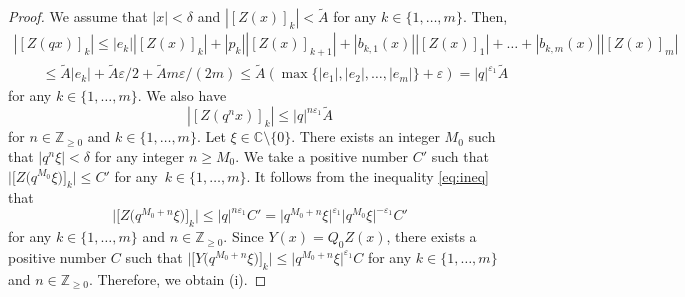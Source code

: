 \documentclass[pdftex]{sigma}
\numberwithin{equation}{section}
\theoremstyle{definition}
\begin{document}
\begin{proof}
We assume that $|x| < \delta $ and $|[Z(x )]_k| < \widetilde{A}$ for any $k \in \{1, \dots ,m \}$.
Then,
\begin{gather}
 | [Z(qx )]_k | \leq |e_k| | [Z(x )]_k| + |p_k | | [Z(x )]_{k+1}| + |b_{k,1}(x)| | [Z(x )]_1| + \dots + |b_{k,m}(x) | |[Z(x )]_m | \nonumber \\
\qquad \leq \widetilde{A} |e_k| + \widetilde{A} \varepsilon /2 + \widetilde{A} m \varepsilon /(2m) \leq \widetilde{A} ( \max \{ |e_1|, |e_2|, \dots , |e_m| \} + \varepsilon ) = |q|^{\varepsilon _1} \widetilde{A} \label{eq:Zqxineq}
\end{gather}
for any $k \in \{1, \dots ,m \}$.
We also have
\begin{equation}
 | [Z(q^n x )]_k | \leq |q|^{n \varepsilon _1} \widetilde{A} \label{eq:ineq}
\end{equation}
for $n \in \mathbb{Z} _{\geq 0} $ and $k \in \{1, \dots ,m \}$.
Let $\xi \in \mathbb{C} \setminus \{0\} $.
There exists an integer $M_0$ such that $| q^n \xi | < \delta $ for any integer $n \geq M_0$.
We take a positive number $C' $ such that $\big| \big[Z\bigl( q^{M_0} \xi \bigr)\big]_k\big| \leq C' $ for any~${k \in \{1, \dots ,m \}}$.
It follows from the inequality \eqref{eq:ineq} that
\[
\big| \big[Z\bigl( q^{M_0 +n} \xi \bigr)\big]_k\big| \leq |q|^{n \varepsilon _1 } C' = \big| q^{M_0 +n} \xi \big|^{\varepsilon _1} \big| q^{M_0 } \xi \big|^{-\varepsilon _1} C'
\]
for any $k \in \{1, \dots ,m \}$ and $n \in \mathbb{Z} _{\geq 0}$.
Since $Y (x) = Q_0 Z(x)$, there exists a positive number $C$ such that $\big| \big[Y\bigl( q^{M_0 +n} \xi \bigr)\big]_k\big| \leq \big|q^{M_0 +n} \xi\big|^{\varepsilon _1} C $ for any $k \in \{1, \dots ,m \}$ and $n \in \mathbb{Z} _{\geq 0}$.
Therefore, we obtain (i).


\end{proof}
\end{document}

